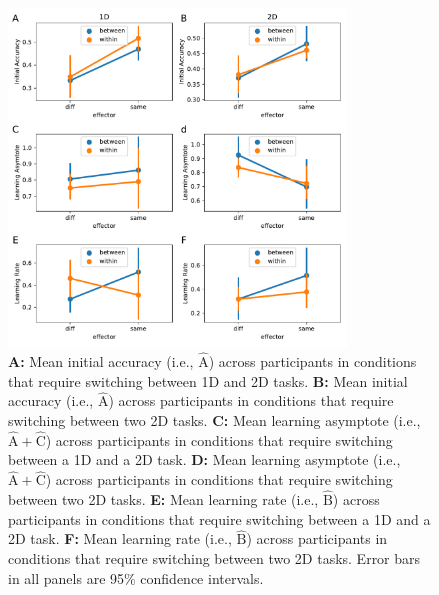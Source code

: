 \documentclass[doc, floatsintext]{apa7}
\begin{document}
\begin{figure}
    \centering
    \includegraphics[width=0.8\textwidth]{../figures/fig_4.pdf}
    \caption{
        \textbf{A:} Mean initial accuracy (i.e.,
        $\hat{\text{A}}$) across participants in conditions that
        require switching between 1D and 2D tasks.
        \textbf{B:} Mean initial accuracy (i.e.,
        $\hat{\text{A}}$) across participants in conditions that
        require switching between two 2D tasks.
        \textbf{C:} Mean learning asymptote (i.e.,
        $\hat{\text{A}}+\hat{\text{C}}$) across participants in
        conditions that require switching between a 1D and a 2D
        task.
        \textbf{D:} Mean learning asymptote (i.e.,
        $\hat{\text{A}}+\hat{\text{C}}$) across participants in
        conditions that require switching between two 2D tasks.
        \textbf{E:} Mean learning rate (i.e., $\hat{\text{B}}$)
        across participants in conditions that require switching
        between a 1D and a 2D task.
        \textbf{F:} Mean learning rate (i.e., $\hat{\text{B}}$)
        across participants in conditions that require switching
        between two 2D tasks.  Error bars in all panels are 95\%
        confidence intervals.
    }
    \label{fig_4}
\end{figure}

\end{document}
